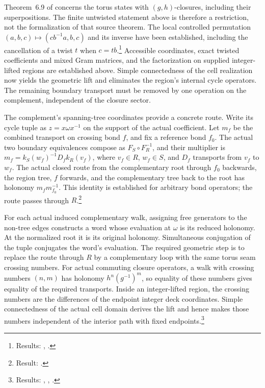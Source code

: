 \documentclass{article}
\begin{document}
Theorem~6.9 of \cite{Schuch2010PEPS} concerns the torus states with
$(g,h)$-closures, including their superpositions. The finite untwisted
statement above is therefore a restriction, not the formalization of
that source theorem. The local controlled permutation
$(a,b,c)\mapsto(cb^{-1}a,b,c)$ and its inverse have been established,
including the cancellation of a twist $t$ when $c=tb$.\footnote{Results:
    ,
    .}
Accessible
coordinates, exact twisted coefficients and mixed Gram matrices, and
the factorization on supplied integer-lifted regions are established above.
Simple connectedness of the cell realization now yields the geometric
lift and eliminates the region's internal cycle operators. The remaining boundary transport
must be removed by one operation on the complement, independent of the
closure sector.

The complement's spanning-tree coordinates provide a concrete route.
Write its cycle tuple as $z=x\omega x^{-1}$ on the support of the
actual coefficient. Let $m_f$ be the combined transport on crossing
bond $f$, and fix a reference bond $f_0$. The actual two boundary
equivalences compose as $F_S\circ F_R^{-1}$, and their multiplier is
$m_f=k_S(w_f)^{-1}D_fk_R(v_f)$, where $v_f\in R$, $w_f\in S$, and
$D_f$ transports from $v_f$ to $w_f$. The actual closed route from
the complementary root through $f_0$ backwards, the region tree,
$f$ forwards, and the complementary tree back to the root has
holonomy $m_fm_{f_0}^{-1}$. This identity is established for arbitrary
bond operators; the route passes through $R$.\footnote{Result:
    .}

For each actual induced complementary walk, assigning free generators
to the non-tree edges constructs a word whose evaluation at $\omega$
is its reduced holonomy. At the normalized root it is its original
holonomy. Simultaneous conjugation of the tuple conjugates the word's
evaluation. The required geometric step is to replace the route through
$R$ by a complementary loop with the same torus seam crossing numbers.
For actual commuting closure operators, a walk with crossing numbers
$(n,m)$ has holonomy $h^n(g^{-1})^m$, so equality of these numbers
gives equality of the required transports. Inside an integer-lifted
region, the crossing numbers are the differences of the endpoint
integer deck coordinates. Simple connectedness of the actual cell
domain derives the lift and hence makes those numbers independent of
the interior path with fixed endpoints.\footnote{Results:
    ,
    ,
    .}
\end{document}
